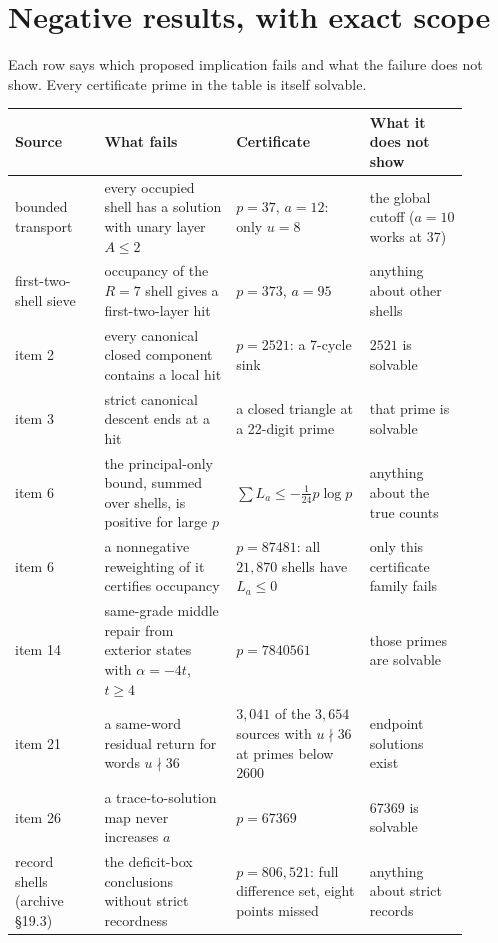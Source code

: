 \section{Negative results, with exact scope}\label{sec:negative}

Each row says which proposed implication fails and what the failure does not show. Every certificate prime in the table is itself solvable.

\begin{center}\small
\begin{longtable}{@{}>{\raggedright\arraybackslash}p{0.19\linewidth}>{\raggedright\arraybackslash}p{0.29\linewidth}>{\raggedright\arraybackslash}p{0.21\linewidth}>{\raggedright\arraybackslash}p{0.21\linewidth}@{}}
\toprule
Source & What fails & Certificate & What it does not show\\
\midrule
\endhead
bounded transport & every occupied shell has a solution with unary layer $A\le2$ & $p=37$, $a=12$: only $u=8$ & the global cutoff ($a=10$ works at $37$)\\
first-two-shell sieve & occupancy of the $R=7$ shell gives a first-two-layer hit & $p=373$, $a=95$ & anything about other shells\\
item 2 & every canonical closed component contains a local hit & $p=2521$: a 7-cycle sink & $2521$ is solvable\\
item 3 & strict canonical descent ends at a hit & a closed triangle at a 22-digit prime & that prime is solvable\\
item 6 & the principal-only bound, summed over shells, is positive for large $p$ & $\sum L_a\le-\frac1{24}p\log p$ & anything about the true counts\\
item 6 & a nonnegative reweighting of it certifies occupancy & $p=87481$: all $21{,}870$ shells have $L_a\le0$ & only this certificate family fails\\
item 14 & same-grade middle repair from exterior states with $\alpha=-4t$, $t\ge4$ & $p=7840561$ & those primes are solvable\\
item 21 & a same-word residual return for words $u\nmid36$ & $3{,}041$ of the $3{,}654$ sources with $u\nmid36$ at primes below $2600$ & endpoint solutions exist\\
item 26 & a trace-to-solution map never increases $a$ & $p=67369$ & $67369$ is solvable\\
record shells (archive §19.3) & the deficit-box conclusions without strict recordness & $p=806{,}521$: full difference set, eight points missed & anything about strict records\\

\end{longtable}
\end{center}
